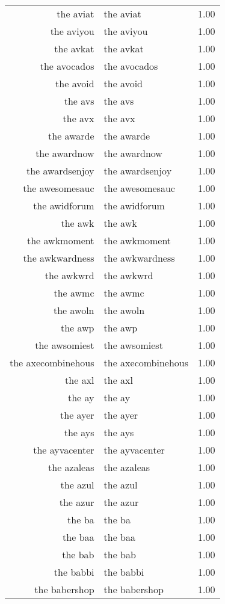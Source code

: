 \begin{table}[ht]
\begin{tabular}{rlr}
  the aviat & the aviat & 1.00 \\ 
  the aviyou & the aviyou & 1.00 \\ 
  the avkat & the avkat & 1.00 \\ 
  the avocados & the avocados & 1.00 \\ 
  the avoid & the avoid & 1.00 \\ 
  the avs & the avs & 1.00 \\ 
  the avx & the avx & 1.00 \\ 
  the awarde & the awarde & 1.00 \\ 
  the awardnow & the awardnow & 1.00 \\ 
  the awardsenjoy & the awardsenjoy & 1.00 \\ 
  the awesomesauc & the awesomesauc & 1.00 \\ 
  the awidforum & the awidforum & 1.00 \\ 
  the awk & the awk & 1.00 \\ 
  the awkmoment & the awkmoment & 1.00 \\ 
  the awkwardness & the awkwardness & 1.00 \\ 
  the awkwrd & the awkwrd & 1.00 \\ 
  the awmc & the awmc & 1.00 \\ 
  the awoln & the awoln & 1.00 \\ 
  the awp & the awp & 1.00 \\ 
  the awsomiest & the awsomiest & 1.00 \\ 
  the axecombinehous & the axecombinehous & 1.00 \\ 
  the axl & the axl & 1.00 \\ 
  the ay & the ay & 1.00 \\ 
  the ayer & the ayer & 1.00 \\ 
  the ays & the ays & 1.00 \\ 
  the ayvacenter & the ayvacenter & 1.00 \\ 
  the azaleas & the azaleas & 1.00 \\ 
  the azul & the azul & 1.00 \\ 
  the azur & the azur & 1.00 \\ 
  the ba & the ba & 1.00 \\ 
  the baa & the baa & 1.00 \\ 
  the bab & the bab & 1.00 \\ 
  the babbi & the babbi & 1.00 \\ 
  the babershop & the babershop & 1.00 \\ 

\end{tabular}
\end{table}
